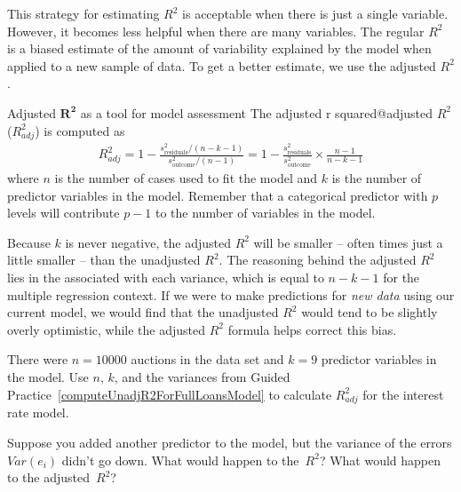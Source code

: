 This strategy for estimating $R^2$ is acceptable when there
is just a single variable.
However, it becomes less helpful when there are many
variables.
The regular $R^2$ is a biased estimate of the amount of
variability explained by the model
when applied to a new sample of data.
To get a better estimate, we use the adjusted $R^2$.

\begin{onebox}{Adjusted $\pmb{R^2}$ as a tool for
    model assessment}
  The 
      {adjusted r squared@adjusted $R^2$ ($R_{adj}^2$)}
  is computed as
  \begin{align*}
  R_{adj}^{2}
    = 1 - \frac{s_{\text{residuals}}^2 / (n-k-1)}
        {s_{\text{outcome}}^2 / (n-1)}
    = 1 - \frac{s_{\text{residuals}}^2}{s_{\text{outcome}}^2}
        \times \frac{n-1}{n-k-1}
  \end{align*}
  where $n$ is the number of cases used to fit the model
  and $k$ is the number of predictor variables in the model.
  Remember that a categorical predictor with $p$ levels will
  contribute $p - 1$ to the number of variables in the model.
\end{onebox}

Because $k$ is never negative, the adjusted $R^2$ will be
smaller -- often times just a little smaller -- than the
unadjusted $R^2$.
The reasoning behind the adjusted $R^2$ lies in the
associated with each variance,
which is equal to $n - k - 1$ for the multiple regression
context.
If we were to make predictions for \emph{new data}
using our current model, we would find that the unadjusted
$R^2$ would tend to be slightly overly optimistic, while
the adjusted $R^2$ formula helps correct this bias.

\begin{exercisewrap}
\begin{nexercise}
There were $n=10000$ auctions in the  data set
and $k=9$ predictor variables in the model.
Use $n$, $k$, and the variances from
Guided Practice~\ref{computeUnadjR2ForFullLoansModel}
to calculate $R_{adj}^2$ for the interest rate
model.\footnotemark
\end{nexercise}
\end{exercisewrap}

\begin{exercisewrap}
\begin{nexercise}
Suppose you added another predictor to the model, but the
variance of the errors $Var(e_i)$ didn't go down.
What would happen to the~$R^2$?
What would happen to the
adjusted~$R^2$?\hspace{0.7mm}\footnotemark
\end{nexercise}
\end{exercisewrap}

